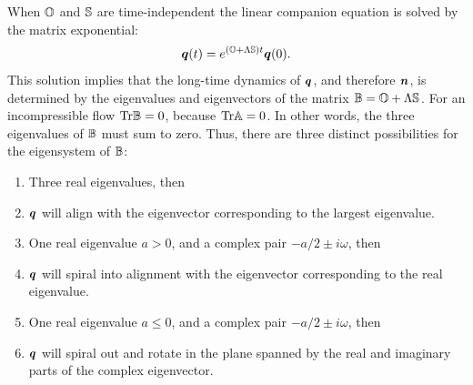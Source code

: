 \documentclass[thesis.tex]{subfiles}
\begin{document}
When $\mathbb{O}$ and $\mathbb{S}$ are time-independent the linear companion equation  is solved by the matrix exponential:
\begin{align*}
		\mbox{\boldmath$q$}(t) = e^{(\mathbb{O} + \Lambda \mathbb{S})t}\mbox{\boldmath$q$}(0).
\end{align*}
This solution implies that the long-time dynamics of $\mbox{\boldmath$q$}$, and therefore $\mbox{\boldmath$n$}$, is determined by the eigenvalues and eigenvectors of the matrix $\mathbb{B} = \mathbb{O} + \Lambda\mathbb{S}$. For an incompressible flow $\mbox{Tr}\mathbb{B}=0$, because $\mbox{Tr}\mathbb{A}=0$. In other words, the three eigenvalues of $\mathbb{B}$ must sum to zero. Thus, there are three distinct possibilities for the eigensystem of $\mathbb{B}$:
\begin{enumerate}
	\item Three real eigenvalues, then
	\item[] $\mbox{\boldmath$q$}$ will align with the eigenvector corresponding to the largest eigenvalue.
	\item One real eigenvalue $a>0$, and a complex pair $-a/2 \pm i\omega$, then
	\item[] $\mbox{\boldmath$q$}$ will spiral into alignment with the eigenvector corresponding to the real eigenvalue.
	\item One real eigenvalue $a\leq0$, and a complex pair $-a/2 \pm i\omega$, then
	\item[] $\mbox{\boldmath$q$}$ will spiral out and rotate in the plane spanned by the real and imaginary parts of the complex eigenvector.
\end{enumerate}
\begin{figure}
\begin{center}
\end{center}
\caption{\label{fig:bmap} }%
\end{figure}
\end{document}
